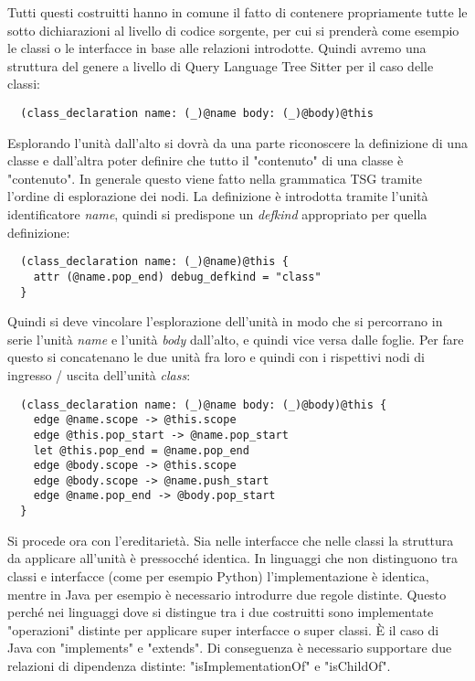 Tutti questi costruitti hanno in comune il fatto di contenere propriamente tutte le sotto dichiarazioni al livello di codice sorgente, per cui si prender\`a come esempio le classi o le interfacce in base alle relazioni introdotte.
Quindi avremo una struttura del genere a livello di Query Language Tree Sitter per il caso delle classi:

\begin{lstlisting}
  (class_declaration name: (_)@name body: (_)@body)@this
\end{lstlisting}

Esplorando l'unit\`a dall'alto si dovr\`a da una parte riconoscere la definizione di una classe e dall'altra poter definire che tutto il "contenuto" di una classe \`e "contenuto".
In generale questo viene fatto nella grammatica TSG tramite l'ordine di esplorazione dei nodi.
La definizione \`e introdotta tramite l'unit\`a identificatore \emph{name}, quindi si predispone un \emph{defkind} appropriato per quella definizione:

\begin{lstlisting}
  (class_declaration name: (_)@name)@this {
    attr (@name.pop_end) debug_defkind = "class"
  }
\end{lstlisting}

Quindi si deve vincolare l'esplorazione dell'unit\`a in modo che si percorrano in serie l'unit\`a \emph{name} e l'unit\`a \emph{body} dall'alto, e quindi vice versa dalle foglie.
Per fare questo si concatenano le due unit\`a fra loro e quindi con i rispettivi nodi di ingresso / uscita dell'unit\`a \emph{class}: 

\begin{lstlisting}
  (class_declaration name: (_)@name body: (_)@body)@this {
    edge @name.scope -> @this.scope
    edge @this.pop_start -> @name.pop_start
    let @this.pop_end = @name.pop_end
    edge @body.scope -> @this.scope
    edge @body.scope -> @name.push_start
    edge @name.pop_end -> @body.pop_start
  }
\end{lstlisting}

Si procede ora con l'ereditariet\`a.
Sia nelle interfacce che nelle classi la struttura da applicare all'unit\`a \`e pressocch\'e identica. In linguaggi che non distinguono tra classi e interfacce (come per esempio Python) l'implementazione \`e identica, mentre in Java per esempio \`e necessario introdurre due regole distinte. Questo perch\'e nei linguaggi dove si distingue tra i due costruitti sono implementate "operazioni" distinte per applicare super interfacce o super classi. \`E il caso di Java con "implements" e "extends". Di conseguenza \`e necessario supportare due relazioni di dipendenza distinte: "isImplementationOf" e "isChildOf".

